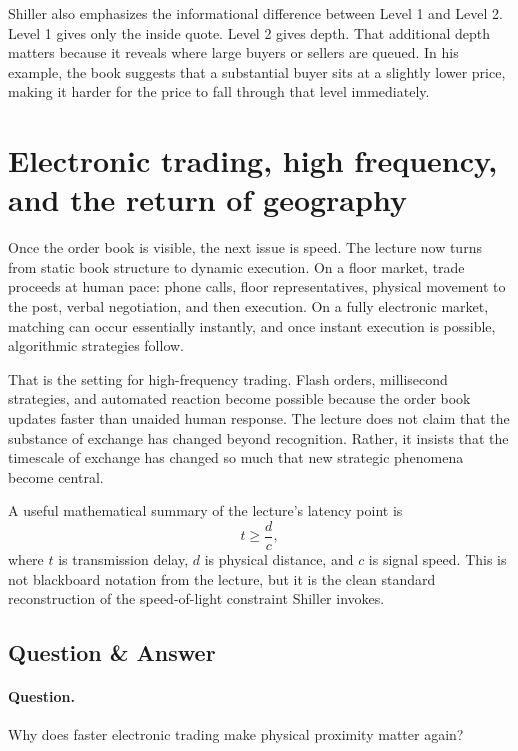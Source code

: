 Shiller also emphasizes the informational difference between Level 1 and Level 2. Level 1 gives only the inside quote. Level 2 gives depth. That additional depth matters because it reveals where large buyers or sellers are queued. In his example, the book suggests that a substantial buyer sits at a slightly lower price, making it harder for the price to fall through that level immediately.

\section{Electronic trading, high frequency, and the return of geography}

Once the order book is visible, the next issue is speed. The lecture now turns from static book structure to dynamic execution. On a floor market, trade proceeds at human pace: phone calls, floor representatives, physical movement to the post, verbal negotiation, and then execution. On a fully electronic market, matching can occur essentially instantly, and once instant execution is possible, algorithmic strategies follow.

That is the setting for high-frequency trading. Flash orders, millisecond strategies, and automated reaction become possible because the order book updates faster than unaided human response. The lecture does not claim that the substance of exchange has changed beyond recognition. Rather, it insists that the timescale of exchange has changed so much that new strategic phenomena become central.

A useful mathematical summary of the lecture's latency point is
\begin{equation}
t \ge \frac{d}{c},
\end{equation}
where \(t\) is transmission delay, \(d\) is physical distance, and \(c\) is signal speed. This is not blackboard notation from the lecture, but it is the clean standard reconstruction of the speed-of-light constraint Shiller invokes.

\subsection{Question \& Answer}

\paragraph{Question.} Why does faster electronic trading make physical proximity matter again?

